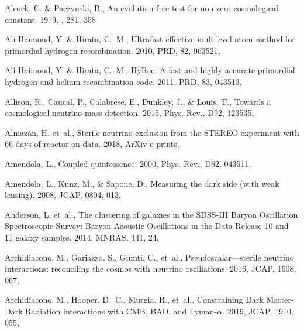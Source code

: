 \documentclass[longauth,traditabstract]{aa}
\def\mnras{{MNRAS}}
\def\prd{{PRD}}
\def\jcap{{JCAP}}
\begin{document}
\begin{thebibliography}{379}
{Alcock}, C. \& {Paczynski}, B., {An evolution free test for non-zero
  cosmological constant}. 1979, \nat, 281, 358

{Ali-Ha{\"i}moud}, Y. \& {Hirata}, C.~M., {Ultrafast effective multilevel atom
  method for primordial hydrogen recombination}. 2010, \prd, 82, 063521,

Ali-Haimoud, Y. \& Hirata, C.~M., {HyRec: A fast and highly accurate primordial
  hydrogen and helium recombination code}. 2011, \prd, 83, 043513,

Allison, R., Caucal, P., Calabrese, E., Dunkley, J., \& Louis, T., {Towards a
  cosmological neutrino mass detection}. 2015, Phys. Rev., D92, 123535,

Almazán, H. {et~al.}, {Sterile neutrino exclusion from the STEREO experiment
  with 66 days of reactor-on data}. 2018, ArXiv e-prints, 

Amendola, L., {Coupled quintessence}. 2000, Phys. Rev., D62, 043511,

Amendola, L., Kunz, M., \& Sapone, D., {Measuring the dark side (with weak
  lensing)}. 2008, \jcap, 0804, 013, 

Anderson, L. {et~al.}, {The clustering of galaxies in the SDSS-III Baryon
  Oscillation Spectroscopic Survey: Baryon Acoustic Oscillations in the Data
  Release 10 and 11 galaxy samples}. 2014, \mnras, 441, 24, 

Archidiacono, M., Gariazzo, S., Giunti, C., {et~al.}, {Pseudoscalar—sterile
  neutrino interactions: reconciling the cosmos with neutrino oscillations}.
  2016, JCAP, 1608, 067, 

Archidiacono, M., Hooper, D.~C., Murgia, R., {et~al.}, {Constraining Dark
  Matter-Dark Radiation interactions with CMB, BAO, and Lyman-$\alpha$}. 2019,
  JCAP, 1910, 055, 


\end{thebibliography}
\end{document}
